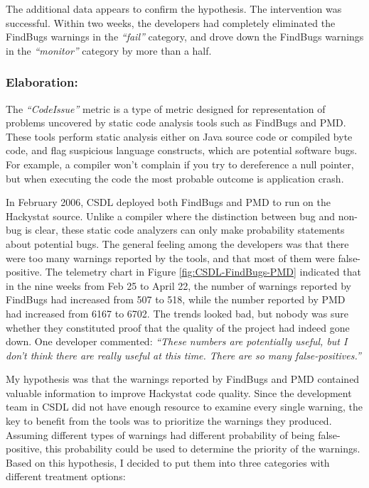 The additional data appears to confirm the hypothesis. The intervention was successful. Within two weeks, the developers had completely eliminated the FindBugs warnings in the \textit{``fail''} category, and drove down the FindBugs warnings in the \textit{``monitor''} category by more than a half.

\subsubsection{Elaboration:}


The \textit{``CodeIssue''} metric is a type of metric designed for representation of problems uncovered by static code analysis tools such as FindBugs\cite{Software:FindBugs} and PMD\cite{Software:PMD}. These tools perform static analysis either on Java source code or compiled byte code, and flag suspicious language constructs, which are potential software bugs. For example, a compiler won't complain if you try to dereference a null pointer, but when executing the code the most probable outcome is application crash.  

In February 2006, CSDL deployed both FindBugs and PMD to run on the Hackystat source. Unlike a compiler where the distinction between bug and non-bug is clear, these static code analyzers can only make probability statements about potential bugs. The general feeling among the developers was that there were too many warnings reported by the tools, and that most of them were false-positive. The telemetry chart in Figure \ref{fig:CSDL-FindBugs-PMD} indicated that in the nine weeks from Feb 25 to April 22, the number of warnings reported by FindBugs had increased from 507 to 518, while the number reported by PMD had increased from 6167 to 6702. The trends looked bad, but nobody was sure whether they constituted proof that the quality of the project had indeed gone down. One developer commented: \textit{``These numbers are potentially useful, but I don't think there are really useful at this time. There are so many false-positives.''} 

My hypothesis was that the warnings reported by FindBugs and PMD contained valuable information to improve Hackystat code quality. Since the development team in CSDL did not have enough resource to examine every single warning, the key to benefit from the tools was to prioritize the warnings they produced. Assuming different types of warnings had different probability of being false-positive, this probability could be used to determine the priority of the warnings.
Based on this hypothesis, I decided to put them into three categories with different treatment options: 

